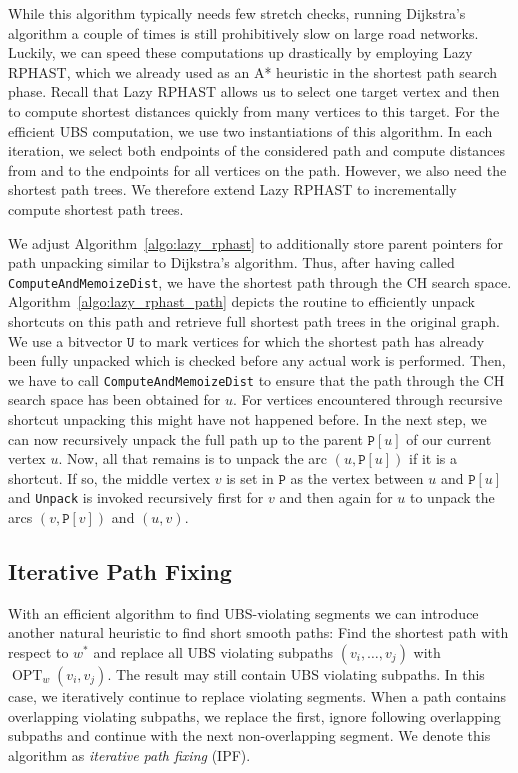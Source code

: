 \documentclass[a4paper,UKenglish,cleveref, autoref, thm-restate]{lipics-v2021}
\newcommand*{\shp}{\operatorname{OPT}}
\begin{document}
While this algorithm typically needs few stretch checks, running Dijkstra's algorithm a couple of times is still prohibitively slow on large road networks.
Luckily, we can speed these computations up drastically by employing Lazy RPHAST, which we already used as an A* heuristic in the shortest path search phase.
Recall that Lazy RPHAST allows us to select one target vertex and then to compute shortest distances quickly from many vertices to this target.
For the efficient UBS computation, we use two instantiations of this algorithm.
In each iteration, we select both endpoints of the considered path and compute distances from and to the endpoints for all vertices on the path.
However, we also need the shortest path trees.
We therefore extend Lazy RPHAST to incrementally compute shortest path trees.

We adjust Algorithm~\ref{algo:lazy_rphast} to additionally store parent pointers for path unpacking similar to Dijkstra's algorithm.
Thus, after having called \texttt{ComputeAndMemoizeDist}, we have the shortest path through the CH search space.
Algorithm~\ref{algo:lazy_rphast_path} depicts the routine to efficiently unpack shortcuts on this path and retrieve full shortest path trees in the original graph.
We use a bitvector $\mathtt{U}$ to mark vertices for which the shortest path has already been fully unpacked which is checked before any actual work is performed.
Then, we have to call \texttt{ComputeAndMemoizeDist} to ensure that the path through the CH search space has been obtained for $u$.
For vertices encountered through recursive shortcut unpacking this might have not happened before.
In the next step, we can now recursively unpack the full path up to the parent $\mathtt{P}[u]$ of our current vertex $u$.
Now, all that remains is to unpack the arc $(u, \mathtt{P}[u])$ if it is a shortcut.
If so, the middle vertex $v$ is set in $\mathtt{P}$ as the vertex between $u$ and $\mathtt{P}[u]$ and \texttt{Unpack} is invoked recursively first for $v$ and then again for $u$ to unpack the arcs $(v, \mathtt{P}[v])$ and $(u,v)$.

\subsection{Iterative Path Fixing}

With an efficient algorithm to find UBS-violating segments we can introduce another natural heuristic to find short smooth paths:
Find the shortest path with respect to $w^*$ and replace all UBS violating subpaths $(v_i,\dots,v_j)$ with $\shp_w(v_i, v_j)$.
The result may still contain UBS violating subpaths.
In this case, we iteratively continue to replace violating segments.
When a path contains overlapping violating subpaths, we replace the first, ignore following overlapping subpaths and continue with the next non-overlapping segment.
We denote this algorithm as \emph{iterative path fixing} (IPF).
\end{document}
